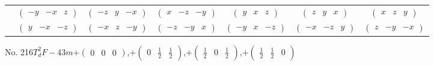 \documentclass[fleqn,9pt,landscape]{jsarticle}
\begin{document}
\begin{center}
\begin{longtable}{ccccccc}
& $ \begin{pmatrix} - y & - x & z \end{pmatrix} $ & $ \begin{pmatrix} - z & y & - x \end{pmatrix} $ & $ \begin{pmatrix} x & - z & - y \end{pmatrix} $ & $ \begin{pmatrix} y & x & z \end{pmatrix} $ & $ \begin{pmatrix} z & y & x \end{pmatrix} $ & $ \begin{pmatrix} x & z & y \end{pmatrix} $ \\
& $ \begin{pmatrix} y & - x & - z \end{pmatrix} $ & $ \begin{pmatrix} - x & z & - y \end{pmatrix} $ & $ \begin{pmatrix} - z & - y & x \end{pmatrix} $ & $ \begin{pmatrix} - y & x & - z \end{pmatrix} $ & $ \begin{pmatrix} - x & - z & y \end{pmatrix} $ & $ \begin{pmatrix} z & - y & - x \end{pmatrix} $ \\
\end{longtable}
\end{center}
\newpage
No. 216\quad$T_{d}^{2}$\quad$F-43m$\quad[ cubic ]\quad$+\begin{pmatrix} 0 & 0 & 0 \end{pmatrix}$,\quad $+\begin{pmatrix} 0 & \frac{1}{2} & \frac{1}{2} \end{pmatrix}$,\quad $+\begin{pmatrix} \frac{1}{2} & 0 & \frac{1}{2} \end{pmatrix}$,\quad $+\begin{pmatrix} \frac{1}{2} & \frac{1}{2} & 0 \end{pmatrix}$
\end{document}
